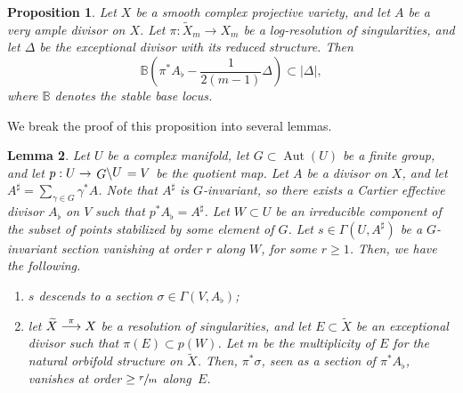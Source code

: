 \documentclass[JEP,XML,SOM,Unicode, NoEqCountersInSection,NoFloatCountersInSection,published]{cedram}
\def\To#1{\mathchoice{\xrightarrow{\textstyle\kern4pt#1\kern3pt}}{\stackrel{#1}{\longrightarrow}}{}{}}
\DeclareMathOperator{\Aut}{Aut}
\theoremstyle{theorem}
\newtheorem{proposition}{Proposition} [section]
\newtheorem{lemma}[proposition]{Lemma}
\theoremstyle{definition}
\newcommand{\quotient}[2]{{\left.\raisebox{-.08em}{$#1$}\middle\backslash\raisebox{.08em}{$#2$}\right.}}
\begin{document}
\begin{proposition} \label{propbaselocus}
Let $X$ be a smooth complex projective variety, and let $A$ be a very ample divisor on $X$. Let $\pi : \widetilde{X}_m \to X_m$ be a log-resolution of singularities, and let $\Delta$ be the exceptional divisor with its reduced structure. Then
\[
\mathbb{B} (\pi^\ast A_\flat - \frac{1}{2(m-1)} \Delta) \subset |\Delta|,
\]
where $\mathbb B$ denotes the stable base locus.
\end{proposition}

We break the proof of this proposition into several lemmas.

\begin{lemma} \label{lemvanishingorder} Let $U$ be a complex manifold, let $G \subset \Aut(U)$ be a finite group, and let $p : U \to \quotient{G}{U} = V$ be the quotient map. Let $A$ be a divisor on $X$, and let $A^\sharp = \sum_{\gamma \in G} \gamma^\ast A$. Note that $A^\sharp$ is $G$-invariant, so there exists a Cartier effective divisor $A_\flat$ on $V$ such that \(p^\ast A_{\flat} = A^{\sharp}\). Let $W \subset U$ be an irreducible component of the subset of points stabilized by some element of $G$. Let $s \in \Gamma (U, A^\sharp)$ be a $G$-invariant section vanishing at order $r$ along $W$, for some $r \geq 1$. Then, we have the following.
\begin{enumerate}
\item $s$ descends to a section $\sigma \in \Gamma(V, A_{\flat})$;
\item let $\widetilde{X} \To{\pi} X$ be a resolution of singularities, and let $E \subset \widetilde{X}$ be an exceptional divisor such that $\pi(E) \subset p(W)$. Let $m$ be the multiplicity of $E$ for the natural orbifold structure on $\widetilde{X}$. Then, $\pi^\ast \sigma$, seen as a section of $\pi^\ast A_\flat$, vanishes at order $\geq \sfrac{r}{m}$ along~$E$.
\end{enumerate}
\end{lemma}
\end{document}
